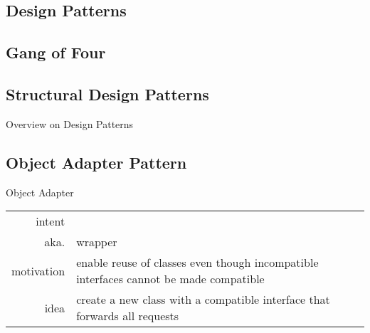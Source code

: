 \subsection{Design Patterns}
\slideDesignPatterns

\subsection{Gang of Four}
\slideGangOfFour

\subsection{Structural Design Patterns}
\begin{frame}[label=structuralpatterns]{Overview on Design Patterns \mytitlesource{\gof}}
	\centering{}
\end{frame}

\subsection{Object Adapter Pattern}
\begin{frame}{\insertsubsection} %
	\begin{fancycolumns}
		\begin{definition}{Object Adapter \mysource{\gof}}
			\setlength\tabcolsep{1mm}
			\begin{tabularx}{\textwidth}{rX}				
				intent & \mycite{Convert the interface of a class into another interface clients expect. Adapter lets classes work together that couldn't otherwise because of incompatible interfaces.}\\
				aka. & wrapper\\
				motivation & enable reuse of classes even though incompatible interfaces cannot be made compatible\\
				idea & create a new class with a compatible interface that forwards all requests
			\end{tabularx}
		\end{definition}
		\nextcolumn
	\end{fancycolumns}
\end{frame}

